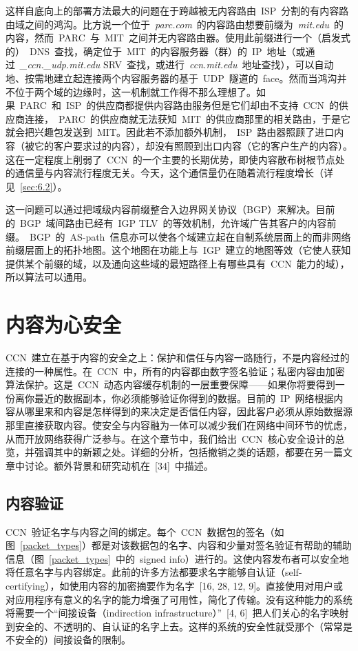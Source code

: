 这样自底向上的部署方法最大的问题在于跨越被无内容路由~ISP~分割的有内容路由域之间的鸿沟。比方说一个位于~\emph{parc.com}~的内容路由想要前缀为~\emph{mit.edu}~的内容，然而~PARC~与~MIT~之间并无内容路由器。使用此前缀进行一个（启发式的）~DNS~查找，确定位于~MIT~的内容服务器（群）的~IP~地址（或通过~\emph{\_ccn.\_udp.mit.edu} SRV~查找，或进行~\emph{ccn.mit.edu}~地址查找），可以自动地、按需地建立起连接两个内容服务器的基于~UDP~隧道的~face。然而当鸿沟并不位于两个域的边缘时，这一机制就工作得不那么理想了。如果~PARC~和~ISP~的供应商都提供内容路由服务但是它们却由不支持~CCN~的供应商连接，~PARC~的供应商就无法获知~MIT~的供应商那里的相关路由，于是它就会把兴趣包发送到~MIT。因此若不添加额外机制，~ISP~路由器照顾了进口内容（被它的客户要求过的内容），却没有照顾到出口内容（它的客户生产的内容）。这在一定程度上削弱了~CCN~的一个主要的长期优势，即使内容散布树根节点处的通信量与内容流行程度无关。今天，这个通信量仍在随着流行程度增长（详见~\ref{sec:6.2}）。

这一问题可以通过把域级内容前缀整合入边界网关协议（BGP）来解决。目前的~BGP~域间路由已经有~IGP TLV~的等效机制，允许域广告其客户的内容前缀。~BGP~的~AS-path~信息亦可以使各个域建立起在自制系统层面上的而非网络前缀层面上的拓扑地图。这个地图在功能上与~IGP~建立的地图等效（它使人获知提供某个前缀的域，以及通向这些域的最短路径上有哪些具有~CCN~能力的域），所以算法可以通用。


\section{内容为心安全}
\label{sec:5}
CCN~建立在基于内容的安全之上：保护和信任与内容一路随行，不是内容经过的连接的一种属性。在~CCN~中，所有的内容都由数字签名验证；私密内容由加密算法保护。这是~CCN~动态内容缓存机制的一层重要保障——如果你将要得到一份离你最近的数据副本，你必须能够验证你得到的数据。目前的~IP~网络根据内容从哪里来和内容是怎样得到的来决定是否信任内容，因此客户必须从原始数据源那里直接获取内容。使安全与内容融为一体可以减少我们在网络中间环节的忧虑，从而开放网络获得广泛参与。在这个章节中，我们给出~CCN~核心安全设计的总览，并强调其中的新颖之处。详细的分析，包括撤销之类的话题，都要在另一篇文章中讨论。额外背景和研究动机在~[34]~中描述。

\subsection{内容验证}
\label{sec:5.1}
CCN~验证名字与内容之间的绑定。每个~CCN~数据包的签名（如图~\ref{packet_types}）都是对该数据包的名字、内容和少量对签名验证有帮助的辅助信息（图~\ref{packet_types}~中的~signed info）进行的。这使内容发布者可以安全地将任意名字与内容绑定。此前的许多方法都要求名字能够自认证（self-certifying），如使用内容的加密摘要作为名字~[16, 28, 12, 9]。直接使用对用户或对应用程序有意义的名字的能力增强了可用性，简化了传输。没有这种能力的系统将需要一个“间接设备（indirection infrastructure）”~[4, 6]~把人们关心的名字映射到安全的、不透明的、自认证的名字上去。这样的系统的安全性就受那个（常常是不安全的）间接设备的限制。

